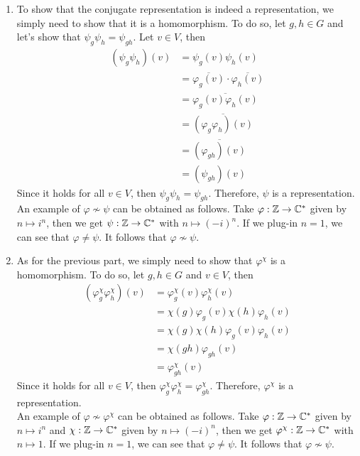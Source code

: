 \begin{solution}
    \begin{enumerate}
        \item To show that the conjugate representation is indeed a representation, we simply need to show that it is a homomorphism. To do so, let $g,h \in G$ and let's show that $\psi_g\psi_h = \psi_{gh}$. Let $v \in V$, then
        \begin{align*}
            (\psi_g\psi_h)(v) &= \psi_g(v)\psi_h(v) \\
            &= \overline{\varphi_g(v)} \cdot \overline{\varphi_h(v)} \\
            &= \overline{\varphi_g(v) \varphi_h(v)} \\
            &= \overline{(\varphi_g \varphi_h)(v)} \\
            &= \overline{(\varphi_{gh})(v)} \\
            &= (\psi_{gh})(v)
        \end{align*}
        Since it holds for all $v \in V$, then $\psi_g\psi_h = \psi_{gh}$. Therefore, $\psi$ is a representation.\\
        An example of $\varphi \not\sim \psi$ can be obtained as follows. Take $\varphi : \mathbb{Z} \to \mathbb{C}^*$ given by $n \mapsto i^n$, then we get $\psi : \mathbb{Z} \to \mathbb{C}^*$ with $n \mapsto (-i)^n$. If we plug-in $n = 1$, we can see that $\varphi \neq \psi$. It follows that $\varphi \not\sim \psi$.
        \item As for the previous part, we simply need to show that $\varphi^{\chi}$ is a homomorphism. To do so, let $g,h \in G$ and $v \in V$, then
        \begin{align*}
            (\varphi^{\chi}_g \varphi^{\chi}_h)(v) &= \varphi^{\chi}_g(v)\varphi^{\chi}_h(v) \\
            &= \chi(g)\varphi_g(v)\chi(h)\varphi_h(v) \\
            &= \chi(g)\chi(h)\varphi_g(v)\varphi_h(v) \\
            &= \chi(gh)\varphi_{gh}(v) \\
            &= \varphi_{gh}^{\chi}(v)
        \end{align*}
        Since it holds for all $v \in V$, then $\varphi^{\chi}_g \varphi^{\chi}_h = \varphi_{gh}^{\chi}$. Therefore, $\varphi^{\chi}$ is a representation.\\
        An example of $\varphi \not\sim \varphi^{\chi}$ can be obtained as follows. Take $\varphi : \mathbb{Z} \to \mathbb{C}^*$ given by $n \mapsto i^n$ and $\chi : \mathbb{Z} \to \mathbb{C}^*$ given by $n \mapsto (-i)^n$, then we get $\varphi^{\chi} : \mathbb{Z} \to \mathbb{C}^*$ with $n \mapsto 1$. If we plug-in $n = 1$, we can see that $\varphi \neq \psi$. It follows that $\varphi \not\sim \psi$. \\
    \end{enumerate}
\end{solution}

